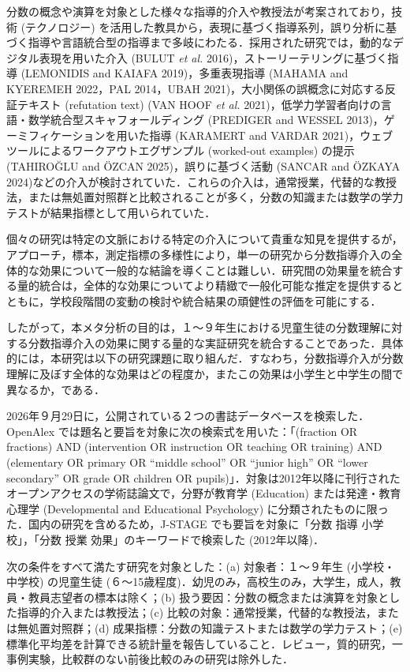 \documentclass[
  lualatex, ja=standard, paper={182mm,257mm}, twocolumn, fontsize=8.5pt, baselineskip=13.5pt,
  line_length=24zw, column_gap=6.1mm, number_of_lines=45, head_space=24.5mm, gutter=16.25mm
]{jlreq}
\newcommand{\chap}[2]{\par\vspace{13.5pt}\needspace{4\baselineskip}{\centering\gtfamily\bfseries #1．#2\par}\nopagebreak}
\newcommand{\secn}[3]{\par\needspace{3\baselineskip}{\noindent\gtfamily\bfseries #1.#2.\hspace{1\zw}#3\par}\nopagebreak}
\begin{document}
分数の概念や演算を対象とした様々な指導的介入や教授法が考案されており，技術 (テクノロジー) を活用した教具から，表現に基づく指導系列，誤り分析に基づく指導や言語統合型の指導まで多岐にわたる．採用された研究では，動的なデジタル表現を用いた介入 (BULUT \textit{et al.} 2016)，ストーリーテリングに基づく指導 (LEMONIDIS and KAIAFA 2019)，多重表現指導 (MAHAMA and KYEREMEH 2022，PAL 2014，UBAH 2021)，大小関係の誤概念に対応する反証テキスト (refutation text)  (VAN HOOF \textit{et al.} 2021)，低学力学習者向けの言語・数学統合型スキャフォールディング (PREDIGER and WESSEL 2013)，ゲーミフィケーションを用いた指導 (KARAMERT and VARDAR 2021)，ウェブツールによるワークアウトエグザンプル (worked-out examples) の提示 (TAHIROĞLU and ÖZCAN 2025)，誤りに基づく活動 (SANCAR and ÖZKAYA 2024)などの介入が検討されていた．これらの介入は，通常授業，代替的な教授法，または無処置対照群と比較されることが多く，分数の知識または数学の学力テストが結果指標として用いられていた．

個々の研究は特定の文脈における特定の介入について貴重な知見を提供するが，アプローチ，標本，測定指標の多様性により，単一の研究から分数指導介入の全体的な効果について一般的な結論を導くことは難しい．研究間の効果量を統合する量的統合は，全体的な効果についてより精緻で一般化可能な推定を提供するとともに，学校段階間の変動の検討や統合結果の頑健性の評価を可能にする．

したがって，本メタ分析の目的は，１〜９年生における児童生徒の分数理解に対する分数指導介入の効果に関する量的な実証研究を統合することであった．具体的には，本研究は以下の研究課題に取り組んだ．すなわち，分数指導介入が分数理解に及ぼす全体的な効果はどの程度か，またこの効果は小学生と中学生の間で異なるか，である．

\chap{2}{方法}
\secn{2}{1}{文献の検索}
2026年９月29日に，公開されている２つの書誌データベースを検索した．OpenAlex では題名と要旨を対象に次の検索式を用いた：「(fraction OR fractions) AND (intervention OR instruction OR teaching OR training) AND (elementary OR primary OR “middle school” OR “junior high” OR “lower secondary” OR grade OR children OR pupils)」．対象は2012年以降に刊行されたオープンアクセスの学術誌論文で，分野が教育学 (Education) または発達・教育心理学 (Developmental and Educational Psychology) に分類されたものに限った．国内の研究を含めるため，J-STAGE でも要旨を対象に「分数 指導 小学校」，「分数 授業 効果」のキーワードで検索した (2012年以降)．

\secn{2}{2}{適格基準}
次の条件をすべて満たす研究を対象とした：(a) 対象者：１〜９年生 (小学校・中学校) の児童生徒 (６〜15歳程度)．幼児のみ，高校生のみ，大学生，成人，教員・教員志望者の標本は除く；(b) 扱う要因：分数の概念または演算を対象とした指導的介入または教授法；(c) 比較の対象：通常授業，代替的な教授法，または無処置対照群；(d) 成果指標：分数の知識テストまたは数学の学力テスト；(e) 標準化平均差を計算できる統計量を報告していること．レビュー，質的研究，一事例実験，比較群のない前後比較のみの研究は除外した．
\end{document}
